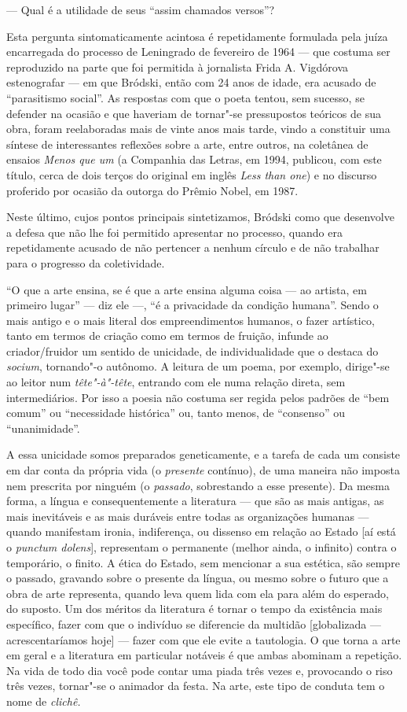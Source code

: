--- Qual é a utilidade de seus ``assim chamados versos''?

Esta pergunta sintomaticamente acintosa é repetidamente formulada pela
juíza encarregada do processo de Leningrado de fevereiro de 1964 ---
que costuma ser reproduzido na parte que foi permitida à jornalista Frida A.
Vigdórova estenografar --- em que Bródski, então com 24 anos de idade,
era acusado de ``parasitismo social''. As respostas com que o poeta
tentou, sem sucesso, se defender na ocasião e que haveriam de tornar"-se
pressupostos teóricos de sua obra, foram reelaboradas mais de vinte anos
mais tarde, vindo a constituir uma síntese de interessantes reflexões
sobre a arte, entre outros, na coletânea de ensaios \emph{Menos que um}
(a Companhia das Letras, em 1994, publicou, com este título, cerca de
dois terços do original em inglês \emph{Less than one}) e no
discurso proferido por ocasião da outorga do Prêmio Nobel, em 1987.

Neste último, cujos pontos principais sintetizamos, Bródski como que
desenvolve a defesa que não lhe foi permitido apresentar no processo,
quando era repetidamente acusado de não pertencer a nenhum círculo e de
não trabalhar para o progresso da coletividade.

``O que a arte ensina, se é que a arte ensina alguma coisa --- ao
artista, em primeiro lugar'' --- diz ele ---, ``é a privacidade da
condição humana''. Sendo o mais antigo e o mais literal dos
empreendimentos humanos, o fazer artístico, tanto em termos de criação
como em termos de fruição, infunde ao criador/fruidor um sentido de
unicidade, de individualidade que o destaca do \emph{socium}, tornando"-o
autônomo. A leitura de um poema, por exemplo, dirige"-se ao leitor num
\emph{tête"-à"-tête}, entrando com ele numa relação direta, sem
intermediários. Por isso a poesia não costuma ser regida pelos padrões
de ``bem comum'' ou ``necessidade histórica'' ou, tanto menos, de
``consenso'' ou ``unanimidade''.

A essa unicidade somos preparados geneticamente, e a tarefa de cada um
consiste em dar conta da própria vida (o \emph{presente} contínuo), de
uma maneira não imposta nem prescrita por ninguém (o \emph{passado},
sobrestando a esse presente). Da mesma forma, a língua e
consequentemente a literatura --- que são as mais antigas, as mais
inevitáveis e as mais duráveis entre todas as organizações humanas ---
quando manifestam ironia, indiferença, ou dissenso em relação ao Estado
[aí está o \emph{punctum dolens}], representam o permanente (melhor ainda, o infinito) contra o temporário, o finito. A ética do
Estado, sem mencionar a sua estética, são sempre o passado, gravando
sobre o presente da língua, ou mesmo sobre o futuro que a obra de arte
representa, quando leva quem lida com ela para além do esperado, do
suposto. Um dos méritos da literatura é tornar o tempo da existência
mais específico, fazer com que o indivíduo se diferencie da multidão
{[}globalizada --- acrescentaríamos hoje{]} --- fazer com que ele evite a
tautologia. O que torna a arte em geral e a literatura em particular
notáveis é que ambas abominam a repetição. Na vida de todo dia você pode
contar uma piada três vezes e, provocando o riso três vezes, tornar"-se o
animador da festa. Na arte, este tipo de conduta tem o nome de
\emph{clichê.}

